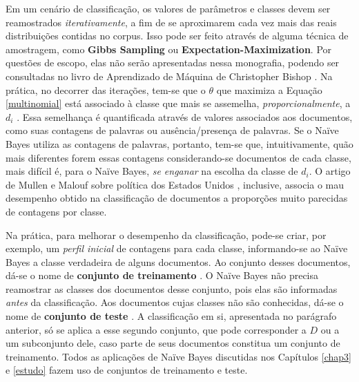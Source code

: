 Em um cenário de classificação, os valores de parâmetros e classes devem ser reamostrados \emph{iterativamente}, a fim de se aproximarem cada vez mais das reais distribuições contidas no corpus. Isso pode ser feito através de alguma técnica de amostragem, como \textbf{Gibbs Sampling} ou \textbf{Expectation-Maximization}. Por questões de escopo, elas não serão apresentadas nessa monografia, podendo ser consultadas no livro de Aprendizado de Máquina de Christopher Bishop \cite{bishop}. Na prática, no decorrer das iterações, tem-se que o \ensuremath{\theta} que maximiza a Equação \ref{multinomial} está associado à classe que mais se assemelha, \emph{proporcionalmente}, a \ensuremath{d_i} \cite{resnik}. Essa semelhança é quantificada através de valores associados aos documentos, como suas contagens de palavras ou ausência/presença de palavras. Se o Naïve Bayes utiliza as contagens de palavras, portanto, tem-se que, intuitivamente, quão mais diferentes forem essas contagens considerando-se documentos de cada classe, mais difícil é, para o Naïve Bayes, \emph{se enganar} na escolha da classe de \ensuremath{d_i}. O artigo de Mullen e Malouf sobre política dos Estados Unidos \cite{aaai-politics}, inclusive, associa o mau desempenho obtido na classificação de documentos a proporções muito parecidas de contagens por classe.





Na prática, para melhorar o desempenho da classificação, pode-se criar, por exemplo, um \emph{perfil inicial} de contagens para cada classe, informando-se ao Naïve Bayes a classe verdadeira de alguns documentos. Ao conjunto desses documentos, dá-se o nome de \textbf{conjunto de treinamento} \cite{bishop}. O Naïve Bayes não precisa reamostrar as classes dos documentos desse conjunto, pois elas são informadas \emph{antes} da classificação. Aos documentos cujas classes não são conhecidas, dá-se o nome de \textbf{conjunto de teste} \cite{bishop}. A classificação em si, apresentada no parágrafo anterior, só se aplica a esse segundo conjunto, que pode corresponder a \ensuremath{D} ou a um subconjunto dele, caso parte de seus documentos constitua um conjunto de treinamento. Todos as aplicações de Naïve Bayes discutidas nos Capítulos \ref{chap3} e \ref{estudo} fazem uso de conjuntos de treinamento e teste.

